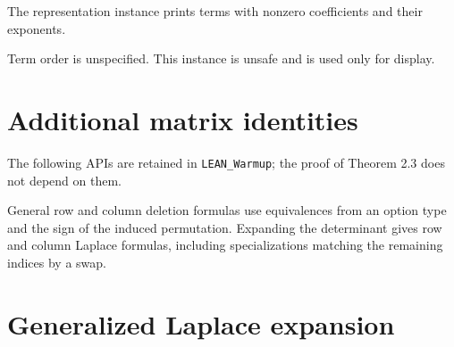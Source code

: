 \begin{definition}

\label{def:display-instance}


\leanok


The representation instance prints terms with nonzero coefficients and their exponents.

Term order is unspecified. This instance is unsafe and is used only for display.

\end{definition}

\section{Additional matrix identities}

The following APIs are retained in \texttt{LEAN\_Warmup}; the proof of Theorem 2.3
does not depend on them.

\begin{lemma}

\label{lem:warmup-laplace}


\leanok


General row and column deletion formulas use equivalences from an option type and the
sign of the induced permutation. Expanding the determinant gives row and column Laplace
formulas, including specializations matching the remaining indices by a swap.

\end{lemma}

\section{Generalized Laplace expansion}

